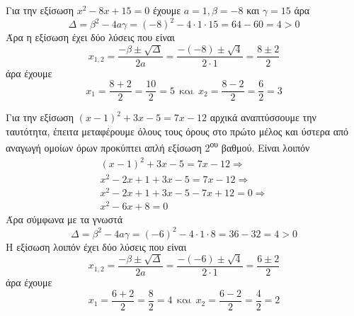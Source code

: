\documentclass[twoside,nofonts,internet,math,spyros]{frontisthrio-diag}
\newcommand{\tss}[1]{\textsuperscript{#1}}
\begin{document}
\begin{thema}
\begin{erwthma}
\begin{alist}
\item Για την εξίσωση $ x^2-8x+15=0 $ έχουμε $ a=1,\beta=-8 $ και $ \gamma=15 $ άρα
\[ \varDelta=\beta^2-4a\gamma=(-8)^2-4\cdot 1\cdot 15=64-60=4>0 \]
Άρα η εξίσωση έχει δύο λύσεις που είναι
\[ x_{1,2}=\frac{-\beta\pm\sqrt{\varDelta}}{2a}=\frac{-(-8)\pm\sqrt{4}}{2\cdot 1}=\frac{8\pm 2}{2} \]
άρα έχουμε 
\[ x_1=\frac{8+2}{2}=\frac{10}{2}=5\ \ \textrm{και}\ \ x_2=\frac{8-2}{2}=\frac{6}{2}=3\]
\item Για την εξίσωση $ (x-1)^2 +3x-5=7x-12 $ αρχικά αναπτύσσουμε την ταυτότητα, έπειτα μεταφέρουμε όλους τους όρους στο πρώτο μέλος και ύστερα από αναγωγή ομοίων όρων προκύπτει απλή εξίσωση 2\tss{ου} βαθμού. Είναι λοιπόν
\begin{gather*}
(x-1)^2 +3x-5=7x-12\Rightarrow\\
x^2-2x+1+3x-5=7x-12\Rightarrow\\
x^2-2x+1+3x-5-7x+12=0\Rightarrow\\
x^2-6x+8=0
\end{gather*}
Άρα σύμφωνα με τα γνωστά
\[ \varDelta=\beta^2-4a\gamma=(-6)^2-4\cdot 1\cdot 8=36-32=4>0 \]
Η εξίσωση λοιπόν έχει δύο λύσεις που είναι
\[ x_{1,2}=\frac{-\beta\pm\sqrt{\varDelta}}{2a}=\frac{-(-6)\pm\sqrt{4}}{2\cdot 1}=\frac{6\pm 2}{2} \]
άρα έχουμε 
\[ x_1=\frac{6+2}{2}=\frac{8}{2}=4\ \ \textrm{και}\ \ x_2=\frac{6-2}{2}=\frac{4}{2}=2\]
\end{alist}


\end{erwthma}
\end{thema}
\end{document}
